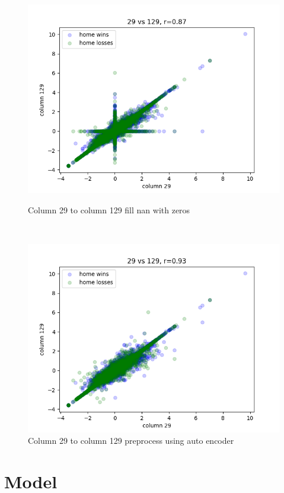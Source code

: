 \documentclass[10pt,a4paper]{article}
\begin{document}
\begin{figure}[ht]
\begin{minipage}{.2\textwidth}
        \centering
        \includegraphics[width=0.8\linewidth]{images/0.87r_29_to_129.png}
        \caption[width=0.8\linewidth]{Column 29 to column 129 fill nan with zeros}
        \label{fig:29-129}
    \end{minipage}%
    \begin{minipage}{.05\textwidth}
        \ 
    \end{minipage}%
    \begin{minipage}{.2\textwidth}
        \centering
        \includegraphics[width=0.8\linewidth]{images/0.93r_29_to_129_recovered.png}
        \caption[width=0.8\linewidth]{Column 29 to column 129 preprocess using auto encoder}
        \label{fig:29-129r}
    \end{minipage}
\end{figure}




\section{Model}
\end{document}
